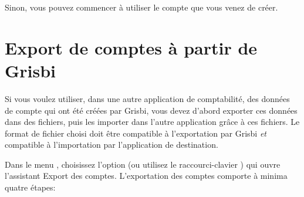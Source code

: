 Sinon, vous pouvez commencer à utiliser le compte que vous venez de créer.


\section{Export de comptes à partir de Grisbi\label{importexport-export}}


Si vous voulez utiliser, dans une autre application de comptabilité, des données de compte qui ont été créées par Grisbi, vous devez d'abord exporter ces données dans des fichiers, puis les importer dans l'autre application grâce à ces fichiers. Le format de fichier choisi doit être compatible à l'exportation par Grisbi \emph{et} compatible à l'importation par l'application de destination.
 
Dans le menu , choisissez l'option   (ou utilisez le raccourci-clavier ) qui ouvre l'assistant Export des comptes. L'exportation des comptes comporte à minima quatre étapes:

